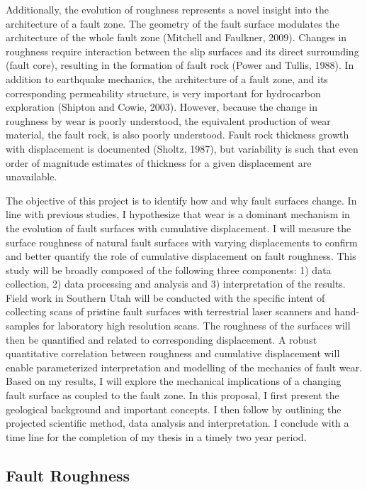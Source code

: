 \documentclass[12pt,a4paper]{article}
\begin{document}
Additionally, the evolution of roughness represents a novel insight into the architecture of a fault zone.  The geometry of the fault surface modulates the architecture of the whole fault zone (Mitchell and Faulkner, 2009). Changes in roughness require interaction between the slip surfaces and its direct surrounding (fault core), resulting in the formation of fault rock (Power and Tullis, 1988). In addition to earthquake mechanics, the architecture of a fault zone, and its corresponding permeability structure, is very important for hydrocarbon exploration (Shipton and Cowie, 2003). However, because the change in roughness by wear is poorly understood, the equivalent production of wear material, the fault rock, is also poorly understood. Fault rock thickness growth with displacement is documented (Sholtz, 1987), but variability is such that even order of magnitude estimates of thickness for a given displacement are unavailable.

	The objective of this project is to identify how and why fault surfaces change. In line with previous studies, I hypothesize that wear is a dominant mechanism in the evolution of fault surfaces with cumulative displacement. I will measure the surface roughness of natural fault surfaces with varying displacements to confirm and better quantify the role of cumulative displacement on fault roughness. This study will be broadly composed of the following three components: 1) data collection, 2) data processing and analysis and 3) interpretation of the results. Field work in Southern Utah will be conducted with the specific intent of collecting scans of pristine fault  surfaces with terrestrial laser scanners and hand-samples for laboratory high resolution scans. The roughness of the surfaces will then be quantified and related to corresponding displacement. A robust quantitative correlation between roughness and cumulative displacement will enable parameterized interpretation and modelling of the mechanics of fault wear. Based on my results, I will explore the mechanical implications of a changing fault surface as coupled to the fault zone. In this proposal, I first present the geological background and important concepts. I then follow by outlining the projected scientific method, data analysis and interpretation. I conclude with a time line for the completion of my thesis in a timely two year period. 


\subsection{Fault Roughness}
\end{document}
